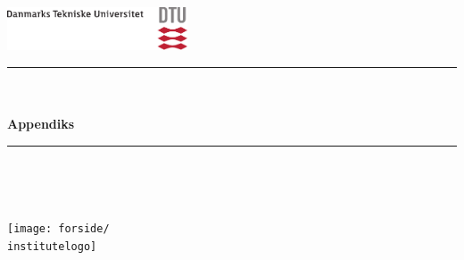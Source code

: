 %
\begin{titlepage}
	\changepage{4cm}{4cm}{-2cm}{-2cm}{}{-2cm}{0cm}{}{}%
	\begin{flushright}
		\includegraphics[width=0.4\textwidth]{forside/DTU_DK_CMYK}
	\end{flushright}
	\centering \parindent=0pt%
	\newcommand{\HRule}{\rule{0.9\textwidth}{1mm}}%
	 \color{DTUred}\HRule\\[1cm]%
	\color{black}\huge\bfseries \titlea\\[0.7cm]%
	\LARGE Appendiks\\[1cm]%
	\color{DTUred}\HRule%
	\color{black}%
	\ifx\group\empty%
	\else
		\Large \group\\[0.5cm]%
	\fi
	\begin{minipage}[t]{0.6\linewidth}
		\begin{center}
		\end{center}
	\end{minipage}
	\\[2cm] %
%	
%
	\begin{minipage}[b]{0.45\linewidth}
		\vfill%
		\texttt{[image: forside/\\institutelogo]}%
	\end{minipage}%
%	
	\hfill%
%	
	\begin{minipage}[b]{0.45\linewidth}
		\normalsize
		\color{DTUgray2}\raggedleft%
		\bl\\
		\bra%
	\end{minipage}
\end{titlepage}